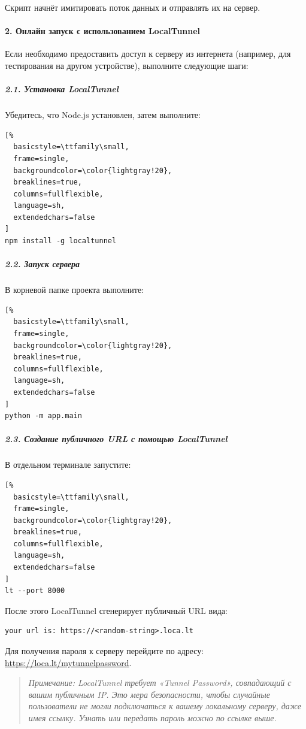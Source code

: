 \documentclass[a4paper,12pt]{article}
\begin{document}
\begin{flushleft}
Скрипт начнёт имитировать поток данных и отправлять их на сервер.

\paragraph{2. Онлайн запуск с использованием LocalTunnel}

Если необходимо предоставить доступ к серверу из интернета (например, для тестирования на другом устройстве), выполните следующие шаги:

\subparagraph{2.1. Установка LocalTunnel}

Убедитесь, что Node.js установлен, затем выполните:
\begin{lstlisting}[%
  basicstyle=\ttfamily\small,
  frame=single,
  backgroundcolor=\color{lightgray!20},
  breaklines=true,
  columns=fullflexible,
  language=sh,
  extendedchars=false
]
npm install -g localtunnel
\end{lstlisting}

\subparagraph{2.2. Запуск сервера}

В корневой папке проекта выполните:
\begin{lstlisting}[%
  basicstyle=\ttfamily\small,
  frame=single,
  backgroundcolor=\color{lightgray!20},
  breaklines=true,
  columns=fullflexible,
  language=sh,
  extendedchars=false
]
python -m app.main
\end{lstlisting}

\subparagraph{2.3. Создание публичного URL с помощью LocalTunnel}

В отдельном терминале запустите:
\begin{lstlisting}[%
  basicstyle=\ttfamily\small,
  frame=single,
  backgroundcolor=\color{lightgray!20},
  breaklines=true,
  columns=fullflexible,
  language=sh,
  extendedchars=false
]
lt --port 8000
\end{lstlisting}

После этого LocalTunnel сгенерирует публичный URL вида:
\begin{verbatim}
your url is: https://<random-string>.loca.lt
\end{verbatim}

Для получения пароля к серверу перейдите по адресу: \href{https://loca.lt/mytunnelpassword}{https://loca.lt/mytunnelpassword}.
\begin{quote}
\textit{Примечание:
LocalTunnel требует «Tunnel Password», совпадающий с вашим публичным IP. Это мера безопасности, чтобы случайные пользователи не могли подключаться к вашему локальному серверу, даже имея ссылку. Узнать или передать пароль можно по ссылке выше.
}
\end{quote}


\end{flushleft}
\end{document}

